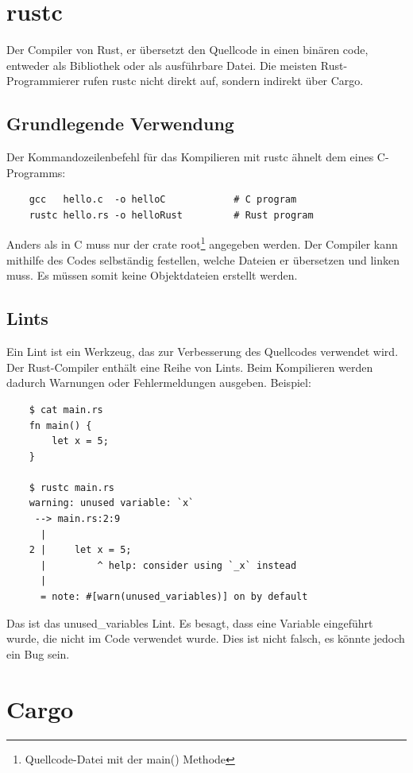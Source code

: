 \section{rustc}

Der Compiler von Rust, er übersetzt den Quellcode in einen binären code, entweder als Bibliothek oder als ausführbare Datei. Die meisten Rust-Programmierer rufen rustc nicht direkt auf, sondern indirekt über Cargo.

\subsection{Grundlegende Verwendung}

Der Kommandozeilenbefehl für das Kompilieren mit rustc ähnelt dem eines C-Programms:

\begin{lstlisting}
    gcc   hello.c  -o helloC            # C program
    rustc hello.rs -o helloRust         # Rust program
\end{lstlisting}

Anders als in C muss nur der crate root\footnote{Quellcode-Datei mit der main() Methode} angegeben werden. Der Compiler kann mithilfe des Codes selbständig festellen, welche Dateien er übersetzen und linken muss. Es müssen somit keine Objektdateien erstellt werden.

\subsection{Lints}

Ein Lint ist ein Werkzeug, das zur Verbesserung des Quellcodes verwendet wird. Der Rust-Compiler enthält eine Reihe von Lints. Beim Kompilieren werden dadurch Warnungen oder Fehlermeldungen ausgeben. Beispiel:

\begin{lstlisting}
    $ cat main.rs
    fn main() {
        let x = 5;
    }

    $ rustc main.rs
    warning: unused variable: `x`
     --> main.rs:2:9
      |
    2 |     let x = 5;
      |         ^ help: consider using `_x` instead
      |
      = note: #[warn(unused_variables)] on by default
\end{lstlisting}

Das ist das \glqq unused\_variables\grqq{} Lint. Es besagt, dass eine Variable eingeführt wurde, die nicht im Code verwendet wurde. Dies ist nicht falsch, es könnte jedoch ein Bug sein.


\section{Cargo}

